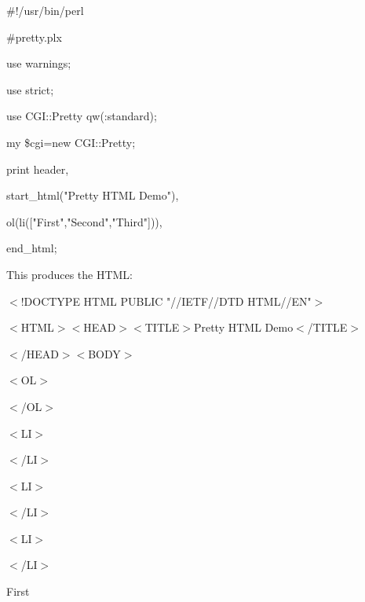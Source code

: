 \documentclass[a4paper,11pt]{book}
\begin{document}
\noindent 

\noindent \#!/usr/bin/perl

\noindent \#pretty.plx

\noindent use warnings;

\noindent use strict;

\noindent use CGI::Pretty qw(:standard);

\noindent 

\noindent my \$cgi=new CGI::Pretty;

\noindent print header,

\noindent start\_html("Pretty HTML Demo"),

\noindent ol(li(["First","Second","Third"])),

\noindent end\_html;

\noindent 

\noindent This produces the HTML:

\noindent 

\noindent $<$!DOCTYPE HTML PUBLIC "//IETF//DTD HTML//EN"$>$

\noindent $<$HTML$>$$<$HEAD$>$$<$TITLE$>$Pretty HTML Demo$<$/TITLE$>$

\noindent $<$/HEAD$>$$<$BODY$>$

\noindent $<$OL$>$

\noindent 

\noindent 

\noindent 

\noindent 

\noindent 

\noindent 

\noindent 

\noindent 

\noindent 

\noindent $<$/OL$>$

\noindent $<$LI$>$

\noindent 

\noindent $<$/LI$>$

\noindent $<$LI$>$

\noindent 

\noindent $<$/LI$>$

\noindent $<$LI$>$

\noindent 

\noindent $<$/LI$>$

\noindent 

\noindent First

\noindent 

\noindent 
\end{document}
